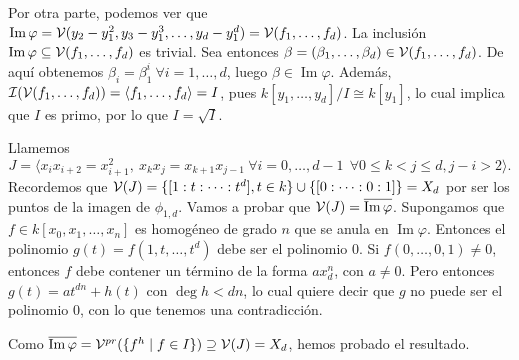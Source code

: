 \documentclass[twoside]{article}
\DeclareMathOperator{\Ima}{Im}
\begin{document}
\begin{solucion}
\begin{enumerate}
Por otra parte, podemos ver que $\Ima\varphi=\V(y_2-y_1^2, y_3-y_1^3,\dots, y_d-y_1^d)=\V(f_1,\dots,f_d)$. La inclusión $\Ima\varphi\subseteq \V(f_1,\dots,f_d)$ es trivial. Sea entonces $\beta=(\beta_1,\dots,\beta_d)\in\mathcal{V}(f_1,\dots,f_d)$. De aquí obtenemos $\beta_i=\beta_1^i\ \forall i=1,\dots, d$, luego $\beta\in\Ima\varphi$.
Además, $\mathcal{I}(\mathcal{V}(f_1,\dots,f_d))=\langle f_1,\dots,f_d\rangle=I$, pues $k[y_1,\dots,y_d]/I\cong k[y_1]$, lo cual implica que $I$ es primo, por lo que $I=\sqrt{I}$. 

Llamemos $$J=\langle x_ix_{i+2}=x_{i+1}^2,\ x_kx_j=x_{k+1}x_{j-1}\ \forall i=0,\dots,d-1\ \ \forall 0\leq k< j\leq d, j-i>2 \rangle.$$ %
Recordemos que $\mathcal{V}(J)=\{[1:t:\dots:t^d], t\in k\}\cup\{[0:\dots:0:1]\}=X_d$ por ser los puntos de la imagen de $\phi_{1,d}$. Vamos a probar que $\V(J)=\overline{\Ima\varphi}$. Supongamos que $f\in k[x_0,x_1,\dots, x_n]$ es homogéneo de grado $n$ que se anula en $\Ima\varphi$. Entonces el polinomio $g(t)=f(1,t,\dots,t^d)$ debe ser el polinomio 0. Si $f(0,\dots,0,1)\neq 0$, entonces $f$ debe contener un término de la forma $ax_d^n$, con $a\neq 0$. Pero entonces $g(t)=at^{dn}+h(t)$ con $\deg h<dn$, lo cual quiere decir que $g$ no puede ser el polinomio 0, con lo que tenemos una contradicción. 

Como $\overline{\Ima\varphi}=\V^{pr}(\{f^h\mid f\in I\})\supseteq\V(J)=X_d$, hemos probado el resultado.


\end{enumerate}
\end{solucion}
\end{document}
